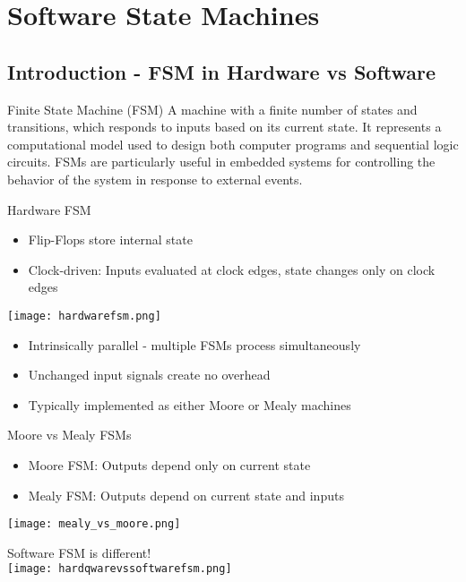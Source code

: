 \section{Software State Machines}

\subsection{Introduction - FSM in Hardware vs Software}

\begin{definition}{Finite State Machine (FSM)}
A machine with a finite number of states and transitions, which responds to inputs based on its current state. It represents a computational model used to design both computer programs and sequential logic circuits. FSMs are particularly useful in embedded systems for controlling the behavior of the system in response to external events.
\end{definition}

\begin{theorem}{Hardware FSM}
    \begin{itemize}
        \item Flip-Flops store internal state
        \item Clock-driven: Inputs evaluated at clock edges, state changes only on clock edges
    \end{itemize}
    \texttt{[image: hardwarefsm.png]}
    \begin{itemize}
    \item Intrinsically parallel - multiple FSMs process simultaneously
    \item Unchanged input signals create no overhead
    \item Typically implemented as either Moore or Mealy machines
\end{itemize}
\end{theorem}

\begin{corollary}{Moore vs Mealy FSMs}
    \begin{itemize}
        \item Moore FSM: Outputs depend only on current state
        \item Mealy FSM: Outputs depend on current state and inputs
    \end{itemize}
    \texttt{[image: mealy\_vs\_moore.png]}
\end{corollary}

\begin{concept}{Software FSM is different!}\\
\texttt{[image: hardqwarevssoftwarefsm.png]}
\end{concept}

